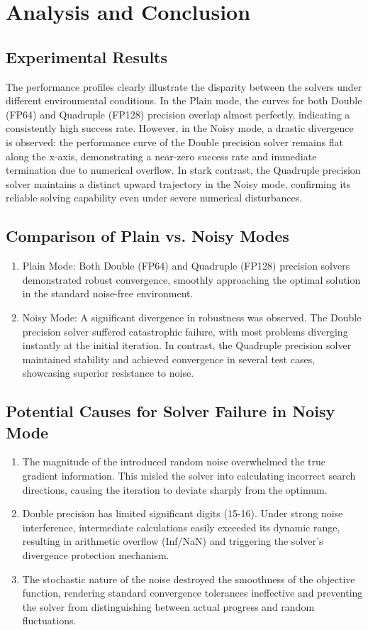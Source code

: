 \documentclass[a4paper,12pt]{article}
\begin{document}
\section{Analysis and Conclusion}
\subsection{Experimental Results}
The performance profiles clearly illustrate the disparity between the solvers under different environmental conditions. In the Plain mode, the curves for both Double (FP64) and Quadruple (FP128) precision overlap almost perfectly, indicating a consistently high success rate. However, in the Noisy mode, a drastic divergence is observed: the performance curve of the Double precision solver remains flat along the x-axis, demonstrating a near-zero success rate and immediate termination due to numerical overflow. In stark contrast, the Quadruple precision solver maintains a distinct upward trajectory in the Noisy mode, confirming its reliable solving capability even under severe numerical disturbances.
\subsection{Comparison of Plain vs. Noisy Modes}
\begin{enumerate}
    \item Plain Mode: Both Double (FP64) and Quadruple (FP128) precision solvers demonstrated robust convergence, smoothly approaching the optimal solution in the standard noise-free environment.
    \item Noisy Mode: A significant divergence in robustness was observed. The Double precision solver suffered catastrophic failure, with most problems diverging instantly at the initial iteration. In contrast, the Quadruple precision solver maintained stability and achieved convergence in several test cases, showcasing superior resistance to noise.
\end{enumerate}

\subsection{Potential Causes for Solver Failure in Noisy Mode}
\begin{enumerate}
    \item The magnitude of the introduced random noise overwhelmed the true gradient information. This misled the solver into calculating incorrect search directions, causing the iteration to deviate sharply from the optimum.
    \item Double precision has limited significant digits (15-16). Under strong noise interference, intermediate calculations easily exceeded its dynamic range, resulting in arithmetic overflow (Inf/NaN) and triggering the solver's divergence protection mechanism.
    \item The stochastic nature of the noise destroyed the smoothness of the objective function, rendering standard convergence tolerances ineffective and preventing the solver from distinguishing between actual progress and random fluctuations.
\end{enumerate}
\end{document}
